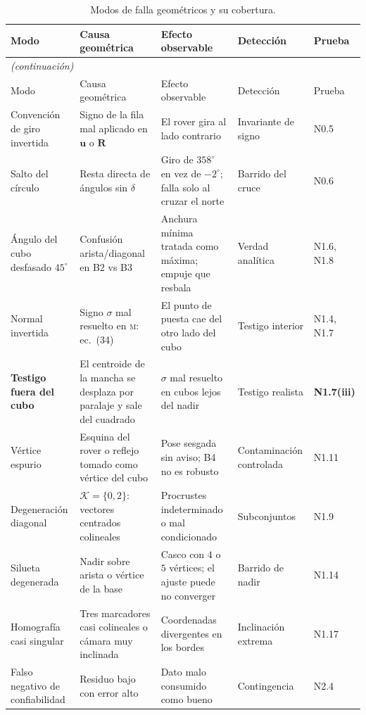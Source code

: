 \documentclass[11pt,a4paper]{article}
\newcommand{\Rot}{\mathbf{R}}
\newcommand{\uu}{\mathbf{u}}
\newcommand{\grados}{^{\circ}}
\begin{document}
\begin{longtable}{p{2.4cm}p{4.1cm}p{4.3cm}p{2.0cm}p{1.5cm}}
\caption{Modos de falla geométricos y su cobertura.}\\
\toprule
Modo & Causa geométrica & Efecto observable & Detección & Prueba \\
\midrule
\endfirsthead
\multicolumn{5}{l}{\small\itshape (continuación)}\\
\toprule
Modo & Causa geométrica & Efecto observable & Detección & Prueba \\
\midrule
\endhead
\bottomrule
\endfoot
Convención de giro invertida & Signo de la fila mal aplicado en $\uu$ o $\Rot$ &
El rover gira al lado contrario & Invariante de signo & N0.5 \\
\addlinespace
Salto del círculo & Resta directa de ángulos sin $\delta$ &
Giro de $358\grados$ en vez de $-2\grados$; falla solo al cruzar el norte &
Barrido del cruce & N0.6 \\
\addlinespace
Ángulo del cubo desfasado $45\grados$ & Confusión arista/diagonal en B2 vs B3 &
Anchura mínima tratada como máxima; empuje que resbala & Verdad analítica & N1.6, N1.8 \\
\addlinespace
Normal invertida & Signo $\sigma$ mal resuelto en \textsc{m}:\,ec.~(34) &
El punto de puesta cae del otro lado del cubo & Testigo interior & N1.4, N1.7 \\
\addlinespace
\textbf{Testigo fuera del cubo} & El centroide de la mancha se desplaza por paralaje y
sale del cuadrado & $\sigma$ mal resuelto en cubos lejos del nadir &
Testigo realista & \textbf{N1.7(iii)} \\
\addlinespace
Vértice espurio & Esquina del rover o reflejo tomado como vértice del cubo &
Pose sesgada sin aviso; B4 no es robusto & Contaminación controlada & N1.11 \\
\addlinespace
Degeneración diagonal & $\mathcal K=\{0,2\}$: vectores centrados colineales &
Procrustes indeterminado o mal condicionado & Subconjuntos & N1.9 \\
\addlinespace
Silueta degenerada & Nadir sobre arista o vértice de la base &
Casco con $4$ o $5$ vértices; el ajuste puede no converger & Barrido de nadir & N1.14 \\
\addlinespace
Homografía casi singular & Tres marcadores casi colineales o cámara muy inclinada &
Coordenadas divergentes en los bordes & Inclinación extrema & N1.17 \\
\addlinespace
Falso negativo de confiabilidad & Residuo bajo con error alto &
Dato malo consumido como bueno & Contingencia & N2.4 \\

\end{longtable}
\end{document}
